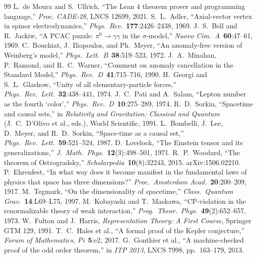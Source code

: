 \documentclass[12pt,a4paper]{article}
\begin{document}
\begin{thebibliography}{99}
 L.~de Moura and S.~Ullrich, ``The Lean 4 theorem prover and programming language,'' \emph{Proc. CADE-28}, LNCS 12699, 2021.
 S.~L.~Adler, ``Axial-vector vertex in spinor electrodynamics,'' \emph{Phys.\ Rev.}\ \textbf{177}:2426--2438, 1969.
 J.~S.~Bell and R.~Jackiw, ``A PCAC puzzle: $\pi^0 \to \gamma\gamma$ in the $\sigma$-model,'' \emph{Nuovo Cim.\ A}\ \textbf{60}:47--61, 1969.
 C.~Bouchiat, J.~Iliopoulos, and Ph.~Meyer, ``An anomaly-free version of Weinberg's model,'' \emph{Phys.\ Lett.\ B}\ \textbf{38}:519--523, 1972.
 J.~A.~Minahan, P.~Ramond, and R.~C.~Warner, ``Comment on anomaly cancellation in the Standard Model,'' \emph{Phys.\ Rev.\ D}\ \textbf{41}:715--716, 1990.
 H.~Georgi and S.~L.~Glashow, ``Unity of all elementary-particle forces,'' \emph{Phys.\ Rev.\ Lett.}\ \textbf{32}:438--441, 1974.
 J.~C.~Pati and A.~Salam, ``Lepton number as the fourth `color','' \emph{Phys.\ Rev.\ D}\ \textbf{10}:275--289, 1974.
 R.~D.~Sorkin, ``Spacetime and causal sets,'' in \emph{Relativity and Gravitation: Classical and Quantum} (J.~C.~D'Olivo et al., eds.), World Scientific, 1991.
 L.~Bombelli, J.~Lee, D.~Meyer, and R.~D.~Sorkin, ``Space-time as a causal set,'' \emph{Phys.\ Rev.\ Lett.}\ \textbf{59}:521--524, 1987.
 D.~Lovelock, ``The Einstein tensor and its generalizations,'' \emph{J.\ Math.\ Phys.}\ \textbf{12}(3):498--501, 1971.
 R.~P.~Woodard, ``The theorem of Ostrogradsky,'' \emph{Scholarpedia}\ \textbf{10}(8):32243, 2015. arXiv:1506.02210.
 P.~Ehrenfest, ``In what way does it become manifest in the fundamental laws of physics that space has three dimensions?'' \emph{Proc.\ Amsterdam Acad.}\ \textbf{20}:200--209, 1917.
 M.~Tegmark, ``On the dimensionality of spacetime,'' \emph{Class.\ Quantum Grav.}\ \textbf{14}:L69--L75, 1997.
 M.~Kobayashi and T.~Maskawa, ``CP-violation in the renormalizable theory of weak interaction,'' \emph{Prog.\ Theor.\ Phys.}\ \textbf{49}(2):652--657, 1973.
 W.~Fulton and J.~Harris, \emph{Representation Theory: A First Course}, Springer GTM 129, 1991.
 T.~C.~Hales et al., ``A formal proof of the Kepler conjecture,'' \emph{Forum of Mathematics, Pi}\ \textbf{5}:e2, 2017.
 G.~Gonthier et al., ``A machine-checked proof of the odd order theorem,'' in \emph{ITP 2013}, LNCS 7998, pp.~163--179, 2013.

\end{thebibliography}
\end{document}
